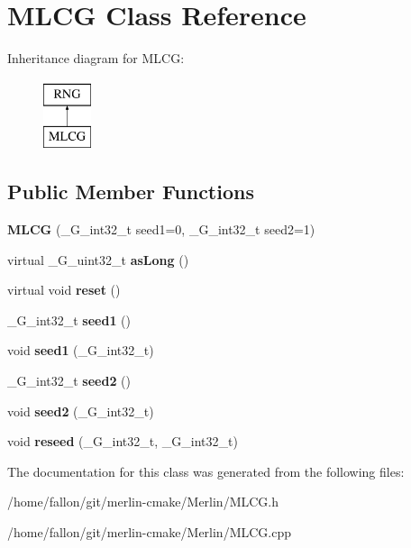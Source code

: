 \hypertarget{classMLCG}{}\section{M\+L\+CG Class Reference}
\label{classMLCG}
Inheritance diagram for M\+L\+CG\+:\begin{figure}[H]
\begin{center}
\leavevmode
\includegraphics[height=2.000000cm]{classMLCG}
\end{center}
\end{figure}
\subsection*{Public Member Functions}
\begin{DoxyCompactItemize}
\item 
\mbox{\label{classMLCG_ac3153b34a4f6bb034253620ff407536e}} 
{\bfseries M\+L\+CG} (\+\_\+\+G\+\_\+int32\+\_\+t seed1=0, \+\_\+\+G\+\_\+int32\+\_\+t seed2=1)
\item 
\mbox{\label{classMLCG_a4e1056e4f4f8b64492b5dd2b3e1d6edf}} 
virtual \+\_\+\+G\+\_\+uint32\+\_\+t {\bfseries as\+Long} ()
\item 
\mbox{\label{classMLCG_a4cd69b7eb0e95fcd6ef166cdd3c9f0e9}} 
virtual void {\bfseries reset} ()
\item 
\mbox{\label{classMLCG_adada9c0545fcd680e6ebc53ed7af48cf}} 
\+\_\+\+G\+\_\+int32\+\_\+t {\bfseries seed1} ()
\item 
\mbox{\label{classMLCG_addf0ae8c4fea56684790536ccf22eeae}} 
void {\bfseries seed1} (\+\_\+\+G\+\_\+int32\+\_\+t)
\item 
\mbox{\label{classMLCG_a83ddc61317cdfd82df1b0f2f1c192528}} 
\+\_\+\+G\+\_\+int32\+\_\+t {\bfseries seed2} ()
\item 
\mbox{\label{classMLCG_a8f75f51a1abc139e5445c1357ff25f42}} 
void {\bfseries seed2} (\+\_\+\+G\+\_\+int32\+\_\+t)
\item 
\mbox{\label{classMLCG_a50a52715dee88153f16bcba1a06dfae7}} 
void {\bfseries reseed} (\+\_\+\+G\+\_\+int32\+\_\+t, \+\_\+\+G\+\_\+int32\+\_\+t)
\end{DoxyCompactItemize}


The documentation for this class was generated from the following files\+:\begin{DoxyCompactItemize}
\item 
/home/fallon/git/merlin-\/cmake/\+Merlin/M\+L\+C\+G.\+h\item 
/home/fallon/git/merlin-\/cmake/\+Merlin/M\+L\+C\+G.\+cpp\end{DoxyCompactItemize}
